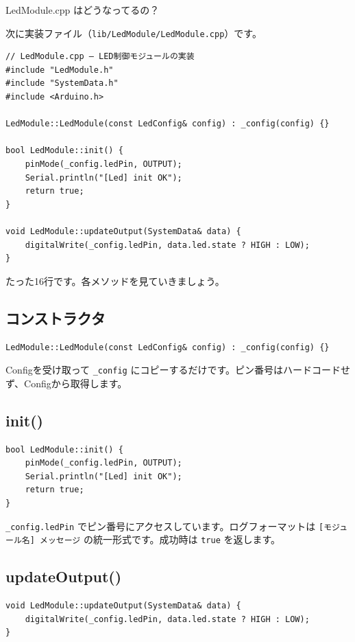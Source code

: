 \begin{qabox}{LedModule.cpp はどうなってるの？}

次に実装ファイル（\texttt{lib/LedModule/LedModule.cpp}）です。

\begin{lstlisting}
// LedModule.cpp — LED制御モジュールの実装
#include "LedModule.h"
#include "SystemData.h"
#include <Arduino.h>

LedModule::LedModule(const LedConfig& config) : _config(config) {}

bool LedModule::init() {
    pinMode(_config.ledPin, OUTPUT);
    Serial.println("[Led] init OK");
    return true;
}

void LedModule::updateOutput(SystemData& data) {
    digitalWrite(_config.ledPin, data.led.state ? HIGH : LOW);
}
\end{lstlisting}

たった16行です。各メソッドを見ていきましょう。

\subsection{コンストラクタ}

\begin{lstlisting}
LedModule::LedModule(const LedConfig& config) : _config(config) {}
\end{lstlisting}

Configを受け取って \texttt{\_config} にコピーするだけです。ピン番号はハードコードせず、Configから取得します。

\subsection{init()}

\begin{lstlisting}
bool LedModule::init() {
    pinMode(_config.ledPin, OUTPUT);
    Serial.println("[Led] init OK");
    return true;
}
\end{lstlisting}

\texttt{\_config.ledPin} でピン番号にアクセスしています。ログフォーマットは \texttt{[モジュール名] メッセージ} の統一形式です。成功時は \texttt{true} を返します。

\subsection{updateOutput()}

\begin{lstlisting}
void LedModule::updateOutput(SystemData& data) {
    digitalWrite(_config.ledPin, data.led.state ? HIGH : LOW);
}
\end{lstlisting}


\end{qabox}
